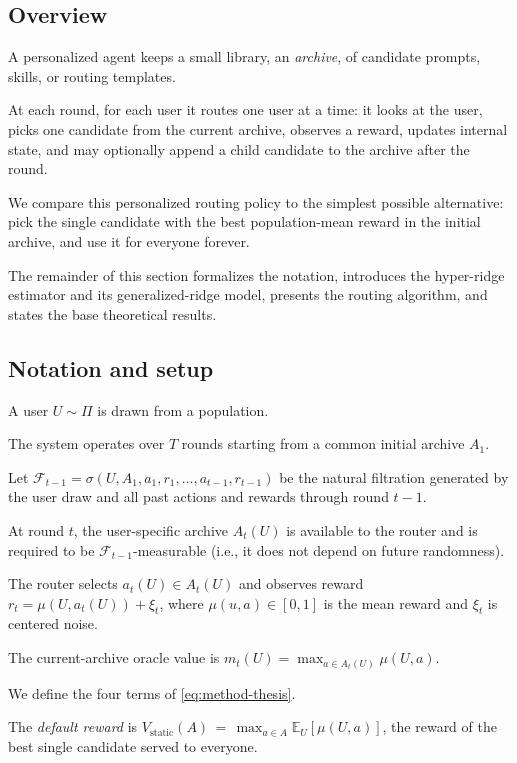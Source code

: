 \documentclass{article} %
\providecommand{\E}{\mathbb{E}}
\begin{document}
\subsection{Overview}

\label{sec:method-plain}

A personalized agent keeps a small library, an \emph{archive}, of candidate prompts, skills, or routing templates.

At each round, for each user it routes one user at a time: it looks at the user, picks one candidate from the current archive, observes a reward, updates internal state, and may optionally append a child candidate to the archive after the round.

We compare this personalized routing policy to the simplest possible alternative: pick the single candidate with the best population-mean reward in the initial archive, and use it for everyone forever.

The remainder of this section formalizes the notation, introduces the hyper-ridge estimator and its generalized-ridge model, presents the routing algorithm, and states the base theoretical results.

\subsection{Notation and setup}

\label{sec:method-notation}

A user $U \sim \Pi$ is drawn from a population.

The system operates over $T$ rounds starting from a common initial archive $A_1$.

Let $\mathcal{F}_{t-1} = \sigma(U, A_1, a_1, r_1, \ldots, a_{t-1}, r_{t-1})$ be the natural filtration generated by the user draw and all past actions and rewards through round $t-1$.

At round $t$, the user-specific archive $A_t(U)$ is available to the router and is required to be $\mathcal{F}_{t-1}$-measurable (i.e., it does not depend on future randomness).

The router selects $a_t(U) \in A_t(U)$ and observes reward $r_t = \mu(U, a_t(U)) + \xi_t$, where $\mu(u,a) \in [0,1]$ is the mean reward and $\xi_t$ is centered noise.

The current-archive oracle value is $m_t(U) = \max_{a \in A_t(U)} \mu(U,a)$.

We define the four terms of \eqref{eq:method-thesis}.

The \emph{default reward} is $V_{\mathrm{static}}(A) \,=\, \max_{a \in A} \E_{U}[\mu(U,a)]$, the reward of the best single candidate served to everyone.
\end{document}
